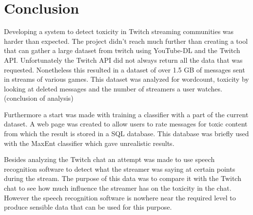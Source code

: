 \documentclass[final]{report}
\begin{document}
\chapter{Conclusion}
\label{ch:conclusion}

Developing a system to detect toxicity in Twitch streaming communities was harder than expected. The project didn't reach much further than creating a tool that can gather a large dataset from twitch using YouTube-DL and the Twitch API. Unfortunately the Twitch API did not always return all the data that was requested. Nonetheless this resulted in a dataset of over 1.5 GB of messages sent in streams of various games. This dataset was analyzed for wordcount, toxicity by looking at deleted messages and the number of streamers a user watches. (conclusion of analysis)

Furthermore a start was made with training a classifier with a part of the current dataset. A web page was created to allow users to rate messages for toxic content from which the result is stored in a SQL database. This database was briefly used with the MaxEnt classifier which gave unrealistic results.

Besides analyzing the Twitch chat an attempt was made to use speech recognition software to detect what the streamer was saying at certain points during the stream. The purpose of this data was to compare it with the Twitch chat to see how much influence the streamer has on the toxicity in the chat. However the speech recognition software is nowhere near the required level to produce sensible data that can be used for this purpose. 
\end{document}
